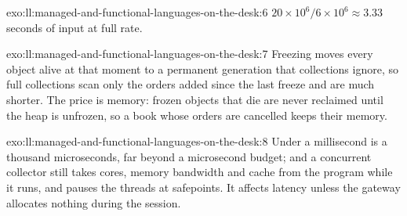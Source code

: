 \begin{solution}{exo:ll:managed-and-functional-languages-on-the-desk:6}
$20 \times 10^6 / 6 \times 10^6 \approx 3.33$ seconds of input at full rate.
\end{solution}

\begin{solution}{exo:ll:managed-and-functional-languages-on-the-desk:7}
Freezing moves every object alive at that moment to a permanent generation that collections ignore, so full collections
scan only the orders added since the last freeze and are much shorter. The price is memory: frozen objects that die are
never reclaimed until the heap is unfrozen, so a book whose orders are cancelled keeps their memory.
\end{solution}

\begin{solution}{exo:ll:managed-and-functional-languages-on-the-desk:8}
Under a millisecond is a thousand microseconds, far beyond a microsecond budget; and a concurrent collector still takes
cores, memory bandwidth and cache from the program while it runs, and pauses the threads at safepoints. It affects latency
unless the gateway allocates nothing during the session.
\end{solution}

